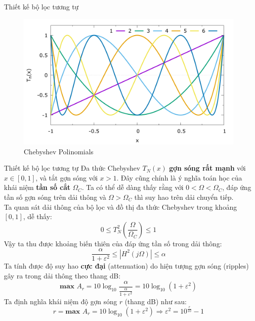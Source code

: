\documentclass[8pt]{beamer}
\begin{document}
\begin{frame}{Thiết kế bộ lọc tương tự}
\begin{figure}[h]
	\includegraphics[width=1\textwidth]{ves_basisf-chebyshev.png}
	\caption{Chebyshev Polinomials}			\label{fig:re2}
		\end{figure}

\end{frame}
\begin{frame}{Thiết kế bộ lọc tương tự}
	Đa thức Chebyshev $T_{N}(x)$ \textbf{gợn sóng rất mạnh} với $x\in[0,1]$, và tắt gợn sóng với $x>1$. Đây cũng chính là ý nghĩa toán học của khái niệm \textbf{tần số cắt} $\Omega_{C}$. Ta có thể dễ dàng thấy rằng với $0<\Omega<\Omega_{C}$, đáp ứng tần số gợn sóng trên dải thông và $\Omega>\Omega_{C}$ thì suy hao trên dải chuyển tiếp. 
	\\ Ta quan sát dải thông của bộ lọc và đồ thị đa thức Chebyshev trong khoảng $[0,1]$, dễ thấy:
$$0\leq T_{N}^2\left(\frac{\Omega}{\Omega_{C}}\right)\leq1$$
Vậy ta thu được khoảng biến thiên của đáp ứng tần số trong dải thông:
$$\frac{\alpha}{1+\varepsilon^2}\leq |H^2(j\Omega)|\leq\alpha$$
Ta tính được độ suy hao \textbf{cực đại} (attenuation) do hiện tượng gợn sóng (ripples) gây ra trong dải thông theo thang dB:
$$\textbf{max }A_{r}=10\log_{10}\frac{\alpha}{\frac{\alpha}{1+\varepsilon^2}}=10\log_{10}(1+\varepsilon^2)$$
Ta định nghĩa khái niệm độ gợn sóng $r$ (thang dB) như sau:
$$r=\textbf{max } A_{r}=10\log_{10}(1+\varepsilon^2)\Rightarrow \varepsilon^2=10^{\frac{r}{10}}-1$$
\end{frame}
\end{document}
